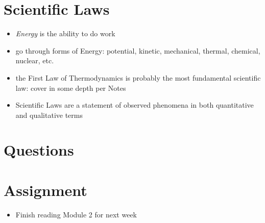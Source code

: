 \documentclass[10pt, oneside]{article}   	%
\begin{document}
\section*{Scientific Laws}
\begin{itemize}
\item \emph{Energy} is the ability to do work
\item go through forms of Energy: potential, kinetic, mechanical, thermal, chemical, nuclear, etc.
\item the First Law of Thermodynamics is probably the most fundamental scientific law: cover in some depth per Notes
\item Scientific Laws are a statement of observed phenomena in both quantitative and qualitative terms
\end{itemize}

\section*{Questions}

\section*{Assignment}
\begin{itemize}
\item Finish reading Module 2 for next week
\end{itemize}
\end{document}
